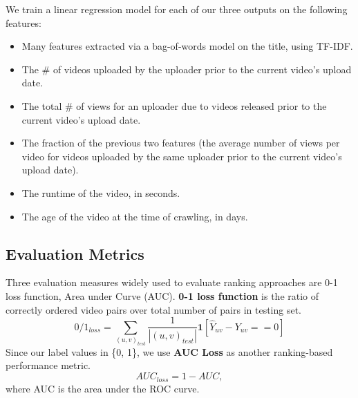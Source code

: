 \documentclass{article} %
\begin{document}
	We train a linear regression model for each of our three outputs on the following features:
	\begin{itemize}
		\item
		Many features extracted via a bag-of-words model on the title, using TF-IDF.
	
		\item
		The \# of videos uploaded by the uploader prior to the current video's upload date.

		\item
		The total \# of views for an uploader due to videos released prior to the current video's upload date.
		
		\item
		The fraction of the previous two features (the average number of views per video for videos uploaded by the same uploader prior to the current video's upload date).
		
		\item
		The runtime of the video, in seconds.
	
		\item
		The age of the video at the time of crawling, in days.
	\end{itemize}
	
	\subsection{Evaluation Metrics}
	Three evaluation measures widely used to evaluate ranking approaches are 0-1 loss function, Area under Curve (AUC). \textbf{0-1 loss function} is the ratio of correctly ordered video pairs over total number of pairs in testing set.
	\begin{equation}
		0/1_{loss} = \sum_{(u, v)_{test}} \frac{1}{|(u,v)_{test}|} \textbf{1}[\hat{Y}_{uv} - Y_{uv} == 0]
	\end{equation}
	Since our label values in \{0, 1\}, we use  \textbf{AUC Loss} as another ranking-based performance metric.
	\begin{equation}
		AUC_{loss} = 1 - AUC,
	\end{equation}
	where AUC is the area under the ROC curve.

\end{document}
